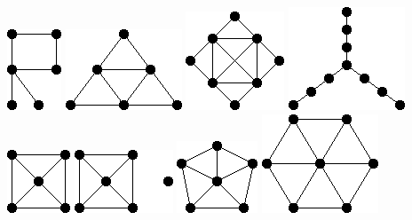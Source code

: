 \documentclass[11pt,paper=b5,footinclude,headinclude]{scrbook} %
\begin{document}
{\includegraphics[scale=0.5,frame]{smallGraphs/g_R.png}     
\includegraphics[scale=0.5,frame]{smallGraphs/g_S3.png}     
\includegraphics[scale=0.5,frame]{smallGraphs/g_S4.png}     
\includegraphics[scale=0.5,frame]{smallGraphs/g_T3.png}     
\includegraphics[scale=0.5,frame]{smallGraphs/g_W4.png}     
\includegraphics[scale=0.5,frame]{smallGraphs/g_W4UK1.png}     
\includegraphics[scale=0.5,frame]{smallGraphs/g_W5.png}     
\includegraphics[scale=0.5,frame]{smallGraphs/g_W6.png}     
}
\end{document}
